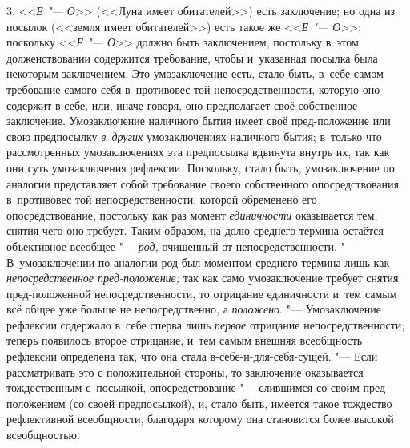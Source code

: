 3. <<{\em Е "--- О}>>
(<<Луна имеет обитателей>>) есть заключение; но одна из посылок
(<<земля имеет обитателей>>) есть такое же <<{\em Е "--- О}>>;
поскольку <<{\em Е "--- О}>>
должно быть заключением, постольку в~этом долженствовании
содержится требование, чтобы и~указанная посылка была некоторым
заключением. Это умозаключение есть, стало быть, в~себе самом требование
самого себя в~противовес той непосредственности, которую оно содержит в
себе, или, иначе говоря, оно предполагает своё собственное заключение.
Умозаключение наличного бытия имеет своё пред-положение или свою
предпосылку {\em в~других}
умозаключениях наличного бытия; в~только что
рассмотренных умозаключениях эта предпосылка вдвинута внутрь
их, так как они суть умозаключения рефлексии. Поскольку, стало быть,
умозаключение по аналогии представляет собой требование своего собственного
опосредствования в~противовес той непосредственности, которой обременено
его опосредствование, постольку как раз момент
{\em единичности}
оказывается тем, снятия чего оно требует. Таким образом, на
долю среднего термина остаётся объективное всеобщее
"--- {\em род,} очищенный от
непосредственности. "--- В~умозаключении по аналогии род был
моментом среднего термина лишь как
{\em непосредственное пред-положение;}
так как само умозаключение требует снятия пред-положенной
непосредственности, то отрицание единичности и~тем самым всё общее уже
больше не непосредственно, а
{\em положено}. "---
Умозаключение рефлексии содержало в~себе сперва лишь
{\em первое} отрицание
непосредственности; теперь появилось второе отрицание, и~тем самым внешняя
всеобщность рефлексии определена так, что она стала
в-себе-и-для-себя-сущей. "--- Если рассматривать это с
положительной стороны, то заключение оказывается тождественным с~посылкой,
опосредствование "--- слившимся со своим пред-положением (со
своей предпосылкой), и, стало быть, имеется такое тождество рефлективной
всеобщности, благодаря которому она становится более высокой
всеобщностью.

